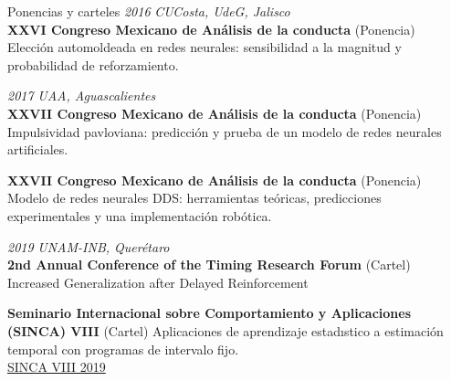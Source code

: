 \documentclass{resume} %
\begin{document}


\begin{rSection}{Ponencias y carteles}
{\em 2016} \hfill {\em CUCosta, UdeG, Jalisco} \\
{\bf XXVI Congreso Mexicano de Análisis de la conducta} (Ponencia) \\
Elección automoldeada en redes neurales: sensibilidad a la magnitud y probabilidad de reforzamiento. 

{\em 2017} \hfill {\em UAA, Aguascalientes} \\
{\bf XXVII Congreso Mexicano de Análisis de la conducta} (Ponencia) \\
Impulsividad pavloviana: predicción y prueba de un modelo de redes neurales artificiales. 

{\bf XXVII Congreso Mexicano de Análisis de la conducta} (Ponencia) \\ 
Modelo de redes neurales DDS: herramientas teóricas, predicciones experimentales y una implementación robótica.

{\em 2019} \hfill {\em UNAM-INB, Querétaro} \\
{\bf 2nd Annual Conference of the Timing Research Forum} (Cartel) \\
Increased Generalization after Delayed Reinforcement

{\bf Seminario Internacional sobre Comportamiento y Aplicaciones (SINCA) VIII } (Cartel)
Aplicaciones de aprendizaje estadıstico a estimación temporal con programas de intervalo fijo.\\
\href{https://www.researchgate.net/profile/Emmanuel-Alcala/publication/352672052_Aplicaciones_de_aprendizaje_estadistico_a_estimacion_temporal_con_programas_de_intervalo_fijo/links/60d29f2592851c34e07cdd31/Aplicaciones-de-aprendizaje-estadistico-a-estimacion-temporal-con-programas-de-intervalo-fijo.pdf}{SINCA VIII 2019}

\end{rSection}
\end{document}
